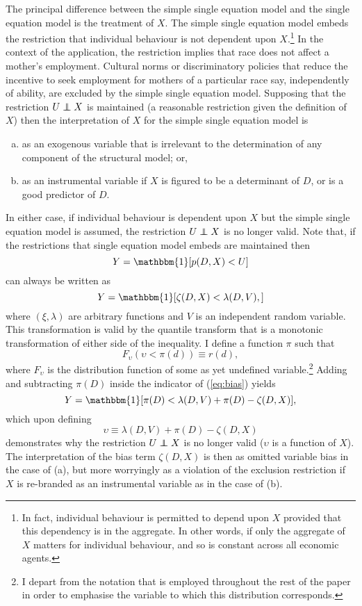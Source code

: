 \documentclass[12pt,a4paper,twoside]{article}
\newcommand\independent{\protect\mathpalette{\protect\independenT}{\perp}}
\def\independenT#1#2{\mathrel{\rlap{$#1#2$}\mkern2mu{#1#2}}}
\numberwithin{equation}{section}
\begin{document}
The principal difference between the simple single equation model and the single equation model is the treatment of $X$. The simple single equation model embeds the restriction that individual behaviour is not dependent upon $X$.\footnote{In fact, individual behaviour is permitted to depend upon $X$ provided that this dependency is in the aggregate. In other words, if only the aggregate of $X$ matters for individual behaviour, and so is constant across all economic agents.} In the context of the application, the restriction implies that race does not affect a mother's employment. Cultural norms or discriminatory policies that reduce the incentive to seek employment for mothers of a particular race say, independently of ability, are excluded by the simple single equation model. Supposing that the restriction $U\independent X$ is maintained (a reasonable restriction given the definition of $X$) then the interpretation of $X$ for the simple single equation model is 
\begin{enumerate}[(a)]
\item as an exogenous variable that is irrelevant to the determination of any component of the structural model; or,
\item as an instrumental variable if $X$ is figured to be a determinant of $D$, or is a good predictor of $D$.
\end{enumerate}   
In either case, if individual behaviour is dependent upon $X$ but the simple single equation model is assumed, the restriction $U\independent X$ is no longer valid. Note that, if the restrictions that single equation model embeds are maintained then
\[Y=\mathbbm{1}[p(D,X)<U]\]
can always be written as
\begin{equation}
Y=\mathbbm{1}[\zeta(D,X)<\lambda(D,V),]\label{eq:bias}
\end{equation}
where $(\xi,\lambda)$ are arbitrary functions and $V$ is an independent random variable. This transformation is valid by the quantile transform that is a monotonic transformation of either side of the inequality. I define a function $\pi$ such that
\[F_{\upsilon}(\upsilon<\pi(d))\equiv r(d),\] 
where $F_\upsilon$ is the distribution function of some as yet undefined variable.\footnote{I depart from the notation that is employed throughout the rest of the paper in order to emphasise the variable to which this distribution corresponds.} Adding and subtracting $\pi(D)$ inside the indicator of (\ref{eq:bias}) yields
\[Y=\mathbbm{1}[\pi(D)<\lambda(D,V)+\pi(D)-\zeta(D,X)],\]
which upon defining 
\[\upsilon\equiv\lambda(D,V)+\pi(D)-\zeta(D,X)\]
demonstrates why the restriction $U\independent X$ is no longer valid ($\upsilon$ is a function of $X$). The interpretation of the bias term $\zeta(D,X)$ is then as omitted variable bias in the case of (a), but more worryingly as a violation of the exclusion restriction if $X$ is re-branded as an instrumental variable as in the case of (b). 
\end{document}
